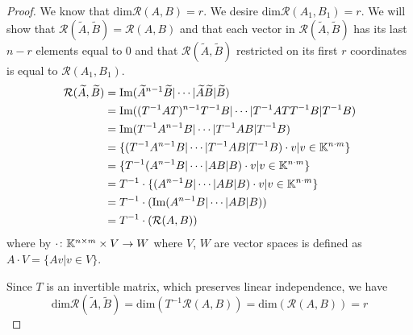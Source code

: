 \begin{proof}
	We know that $\text{dim}\mathcal{R}(A,B)=r$. We desire $\text{dim}\mathcal{R}(A_1,B_1)=r$. We will show that $\mathcal{R}(\widetilde{A},\widetilde{B})=\mathcal{R}(A,B)$ and that each vector in $\mathcal{R}(\widetilde{A},\widetilde{B})$ has its last $n-r$ elements equal to 0 and that $\mathcal{R}(\widetilde{A},\widetilde{B})$ restricted on its first $r$ coordinates is equal to $\mathcal{R}(A_1,B_1)$. 
	\begin{align*}
		\mathcal{R}(\widetilde{A},\widetilde{B})&=\text{Im}(\widetilde{A}^{n-1}\widetilde{B}|\cdots|\widetilde{A}\widetilde{B}|\widetilde{B}) \\
		&=\text{Im}((T^{-1}AT)^{n-1}T^{-1}B|\cdots|T^{-1}ATT^{-1}B|T^{-1}B) \\
		&=\text{Im}(T^{-1}A^{n-1}B|\cdots|T^{-1}AB|T^{-1}B) \\
		&=\{(T^{-1}A^{n-1}B|\cdots|T^{-1}AB|T^{-1}B)\cdot v | v \in \mathbb{K}^{n\cdot m}\} \\
		&=\{T^{-1}(A^{n-1}B|\cdots|AB|B)\cdot v | v \in \mathbb{K}^{n\cdot m}\} \\
		&=T^{-1}\cdot\{(A^{n-1}B|\cdots|AB|B)\cdot v | v \in \mathbb{K}^{n\cdot m}\} \\
		&=T^{-1}\cdot(\text{Im}(A^{n-1}B|\cdots|AB|B)) \\
		&=T^{-1}\cdot(\mathcal{R}(A,B))
	\end{align*}
	where by $\cdot\colon\mathbb{K}^{n\times m}\times V\rightarrow W$ where $V$, $W$ are vector spaces is defined as $A\cdot V=\{Av|v\in V\}$.

	Since $T$ is an invertible matrix, which preserves linear independence, we have $$\text{dim}\mathcal{R}(\widetilde{A},\widetilde{B})=\text{dim}(T^{-1}\mathcal{R}(A,B))=\text{dim}(\mathcal{R}(A,B))=r$$


\end{proof}

